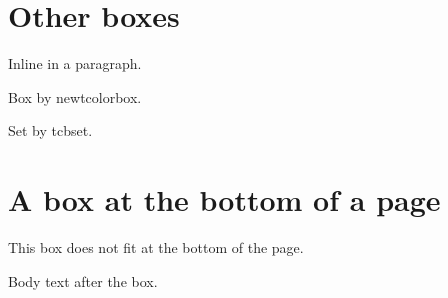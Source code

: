 \expandafter\documentclass\expandafter[\CLSOPT]{\CLS}
\begin{document}
\section*{Other boxes}

Inline 
in a paragraph.

\begin{notebox}[title=notebox]
Box by newtcolorbox.
\end{notebox}

\begingroup
{}
\begin{tcolorbox}
Set by tcbset.
\end{tcolorbox}
\endgroup

\newpage
\section*{A box at the bottom of a page}

\vspace{\dimexpr\textheight-12\baselineskip\relax}
\begin{tcolorbox}
This box does not fit at the bottom of the page.
\end{tcolorbox}

Body text after the box.

\end{document}
